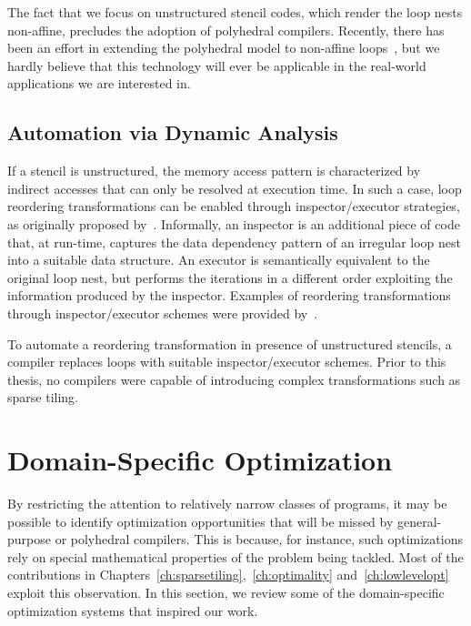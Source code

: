 The fact that we focus on unstructured stencil codes, which render the loop nests non-affine, precludes the adoption of polyhedral compilers. Recently, there has been an effort in extending the polyhedral model to non-affine loops~\citep{sparse-poly-framework}, but we hardly believe that this technology will ever be applicable in the real-world applications we are interested in.


\subsection{Automation via Dynamic Analysis}
\label{sec:bkg:ie}

If a stencil is unstructured, the memory access pattern is characterized by indirect accesses that can only be resolved at execution time. In such a case, loop reordering transformations can be enabled through inspector/executor strategies, as originally proposed by~\cite{ST-Saltz91}. Informally, an inspector is an additional piece of code that, at run-time, captures the data dependency pattern of an irregular loop nest into a suitable data structure. An executor is semantically equivalent to the original loop nest, but performs the iterations in a different order exploiting the information produced by the inspector. Examples of reordering transformations through inspector/executor schemes were provided by~\cite{ST-StroutPLDI03}. 

To automate a reordering transformation in presence of unstructured stencils, a compiler replaces loops with suitable inspector/executor schemes. Prior to this thesis, no compilers were capable of introducing complex transformations such as sparse tiling. 






\section{Domain-Specific Optimization}
\label{sec:bkg:dslopt}
By restricting the attention to relatively narrow classes of programs, it may be possible to identify optimization opportunities that will be missed by general-purpose or polyhedral compilers. This is because, for instance, such optimizations rely on special mathematical properties of the problem being tackled. Most of the contributions in Chapters~\ref{ch:sparsetiling},~\ref{ch:optimality} and~\ref{ch:lowlevelopt} exploit this observation. In this section, we review some of the domain-specific optimization systems that inspired our work. 

